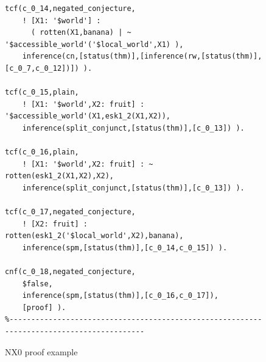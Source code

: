 \documentclass{ceurart}
\begin{document}
\begin{figure}[h!]
{{\begin{verbatim}
tcf(c_0_14,negated_conjecture,
    ! [X1: '$world'] :
      ( rotten(X1,banana) | ~ '$accessible_world'('$local_world',X1) ),
    inference(cn,[status(thm)],[inference(rw,[status(thm)],[c_0_7,c_0_12])]) ).

tcf(c_0_15,plain,
    ! [X1: '$world',X2: fruit] : '$accessible_world'(X1,esk1_2(X1,X2)),
    inference(split_conjunct,[status(thm)],[c_0_13]) ).

tcf(c_0_16,plain,
    ! [X1: '$world',X2: fruit] : ~ rotten(esk1_2(X1,X2),X2),
    inference(split_conjunct,[status(thm)],[c_0_13]) ).

tcf(c_0_17,negated_conjecture,
    ! [X2: fruit] : rotten(esk1_2('$local_world',X2),banana),
    inference(spm,[status(thm)],[c_0_14,c_0_15]) ).

cnf(c_0_18,negated_conjecture,
    $false,
    inference(spm,[status(thm)],[c_0_16,c_0_17]),
    [proof] ).
%------------------------------------------------------------------------------------------
\end{verbatim}
}}
\caption{NX0 proof example}
\label{NX0Proof}
\end{figure}
\end{document}
